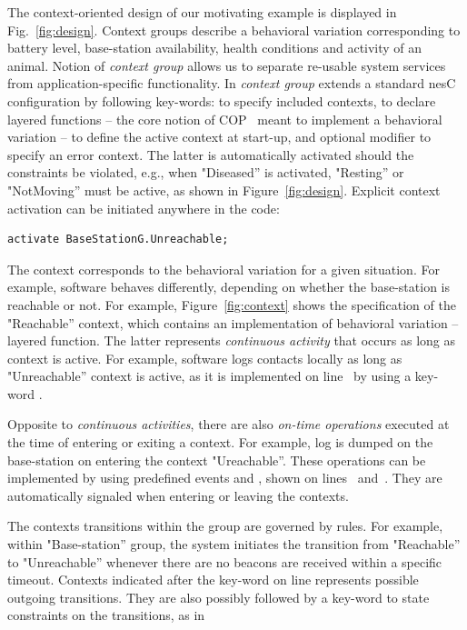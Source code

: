 The context-oriented design of our motivating example is displayed in
Fig.~\ref{fig:design}. Context groups describe a behavioral variation
corresponding to battery level, base-station availability, health conditions and
activity of an animal. Notion of \emph{context group} allows us to separate
re-usable system services from application-specific functionality. In \conesc
\emph{context group} extends a standard nesC configuration by following
key-words:  to specify included contexts,  to
declare layered functions -- the core notion of COP~\cite{Hirschfeld08} meant to
implement a behavioral variation --  to define the active
context at start-up, and optional modifier  to specify an error
context. The latter is automatically activated should the constraints be
violated, e.g., when "Diseased'' is activated, "Resting'' or "NotMoving'' must
be active, as shown in Figure~\ref{fig:design}. Explicit context activation can
be initiated anywhere in the code:

\vspace{-1mm}
\begin{lstlisting}[language=conesc]
activate BaseStationG.Unreachable;
\end{lstlisting}
\vspace{-1.5mm}

The context corresponds to the behavioral variation for a given situation. For
example, software behaves differently, depending on whether the base-station is
reachable or not. For example, Figure~\ref{fig:context} shows the \conesc
specification of the "Reachable'' context, which contains an implementation of
behavioral variation -- layered function. The latter represents \emph{continuous
activity} that occurs as long as context is active. For example, software logs
contacts locally as long as "Unreachable'' context is active, as it is
implemented on line~ by using a key-word .

Opposite to \emph{continuous activities}, there are also \emph{on-time
operations} executed at the time of entering or exiting a context. For example,
log is dumped on the base-station on entering the context "Ureachable''. These
operations can be implemented by using predefined events  and
, shown on lines~
and~. They are automatically signaled when
entering or leaving the contexts.

The contexts transitions within the group are governed by rules. For example,
within "Base-station'' group, the system initiates the transition from
"Reachable'' to "Unreachable'' whenever there are no beacons are received within
a specific timeout. Contexts indicated after the key-word  on
line  represents possible outgoing transitions. They are also
possibly followed by a key-word  to state constraints on the
transitions, as in

